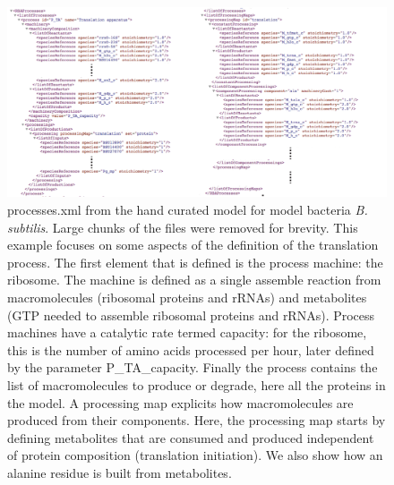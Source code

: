 \begin{figure}
  \centering
  \includegraphics[scale=0.4]{figures/processes_ex_1}
  \caption{processes.xml from the hand curated model for model bacteria \textit{B. subtilis}.
  Large chunks of the files were removed for brevity.
  This example focuses on some aspects of the definition of the translation process.
  The first element that is defined is the process machine: the ribosome.
  The machine is defined as a single assemble reaction from
  macromolecules (ribosomal proteins and rRNAs)
  and metabolites (GTP needed to assemble ribosomal proteins and rRNAs).
  Process machines have a catalytic rate termed capacity:
  for the ribosome, this is the number of amino acids processed per hour,
  later defined by the parameter P\_TA\_capacity.
  Finally the process contains the list of macromolecules to produce or degrade,
  here all the proteins in the model.
  A processing map explicits how macromolecules are produced from their components.
  Here, the processing map starts by defining metabolites that are consumed and
  produced independent of protein composition (translation initiation).
  We also show how an alanine residue is built from metabolites.}
  \label{fig:processes_ex_1}
\end{figure}

